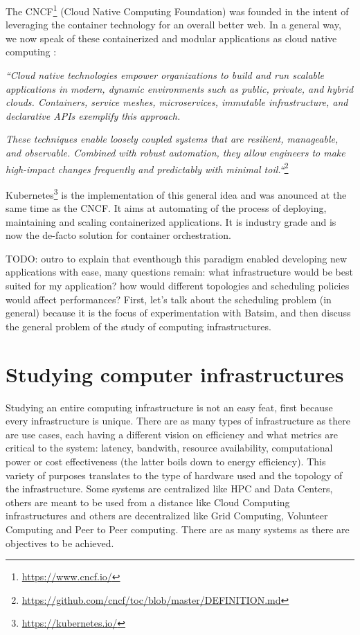 \documentclass[12pt, a4paper]{memoir}
\begin{document}
The CNCF\footnote{\url{https://www.cncf.io/}} (Cloud Native Computing
Foundation) was founded in the intent of leveraging the container technology
for an overall better web. In a general way, we now speak of these
containerized and modular applications as cloud native computing :

\textit{``Cloud native technologies empower organizations to build and run
	scalable applications in modern, dynamic environments such as public,
	private, and hybrid clouds. Containers, service meshes, microservices,
	immutable infrastructure, and declarative APIs exemplify this
	approach.}

\textit{These techniques enable loosely coupled systems that
	are resilient, manageable, and observable.  Combined with robust
	automation, they allow engineers to make high-impact changes frequently
	and predictably with minimal toil.``}\footnote{\url{https://github.com/cncf/toc/blob/master/DEFINITION.md}}

Kubernetes\footnote{\url{https://kubernetes.io/}} is the implementation of this
general idea and was anounced at the same time as the CNCF. It aims at
automating of the process of deploying, maintaining and scaling containerized
applications. It is industry grade and is now the de-facto solution for
container orchestration.

TODO: outro to explain that eventhough this paradigm enabled developing new
applications with ease, many questions remain: what infrastructure would be
best suited for my application? how would different topologies and scheduling
policies would affect performances?  First, let's talk about the scheduling
problem (in general) because it is the focus of experimentation with Batsim,
and then discuss the general problem of the study of computing infrastructures.

\section{Studying computer infrastructures} \label{study-computing-infra}

Studying an entire computing infrastructure is not an easy feat, first because
every infrastructure is unique. There are as many types of infrastructure as
there are use cases, each having a different vision on efficiency and what
metrics are critical to the system: latency, bandwith, resource availability,
computational power or cost effectiveness (the latter boils down to energy
efficiency). This variety of purposes translates to the type of hardware used
and the topology of the infrastructure. Some systems are centralized like HPC
and Data Centers, others are meant to be used from a distance like Cloud
Computing infrastructures and others are decentralized like Grid Computing,
Volunteer Computing and Peer to Peer computing. There are as many systems as
there are objectives to be achieved.
\end{document}
